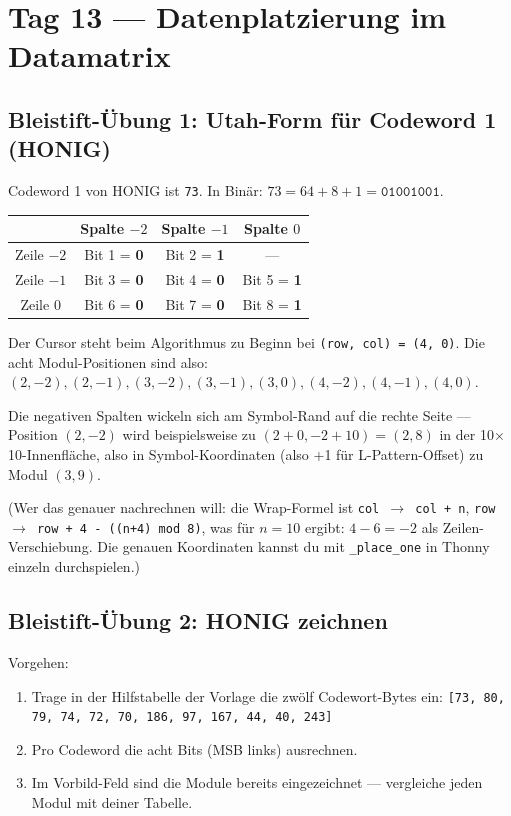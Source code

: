 \section*{Tag 13 — Datenplatzierung im Datamatrix}

\subsection*{Bleistift-Übung 1: Utah-Form für Codeword 1 (HONIG)}

Codeword 1 von HONIG ist \texttt{73}. In Binär: $73 = 64 + 8 + 1 =
\texttt{01001001}$.

\begin{center}
\small
\begin{tabular}{c | c c c}
\toprule
& Spalte $-2$ & Spalte $-1$ & Spalte $0$ \\
\midrule
Zeile $-2$ & Bit 1 = \textbf{0} & Bit 2 = \textbf{1} & --- \\
Zeile $-1$ & Bit 3 = \textbf{0} & Bit 4 = \textbf{0} & Bit 5 = \textbf{1} \\
Zeile $0$  & Bit 6 = \textbf{0} & Bit 7 = \textbf{0} & Bit 8 = \textbf{1} \\
\bottomrule
\end{tabular}
\end{center}

Der Cursor steht beim Algorithmus zu Beginn bei \texttt{(row, col) =
(4, 0)}. Die acht Modul-Positionen sind also:
$(2, -2), (2, -1), (3, -2), (3, -1), (3, 0), (4, -2), (4, -1), (4, 0)$.

Die negativen Spalten wickeln sich am Symbol-Rand auf die rechte
Seite — Position $(2, -2)$ wird beispielsweise zu $(2 + 0, -2 + 10) =
(2, 8)$ in der 10$\times$10-Innenfläche, also in Symbol-Koordinaten
(also +1 für L-Pattern-Offset) zu Modul $(3, 9)$.

(Wer das genauer nachrechnen will: die Wrap-Formel ist
\texttt{col $\to$ col + n}, \texttt{row $\to$ row + 4 - ((n+4) mod 8)},
was für $n=10$ ergibt: $4 - 6 = -2$ als Zeilen-Verschiebung. Die
genauen Koordinaten kannst du mit \texttt{\_place\_one} in Thonny
einzeln durchspielen.)

\subsection*{Bleistift-Übung 2: HONIG zeichnen}

Vorgehen:

\begin{enumerate}
\item Trage in der Hilfstabelle der Vorlage die zwölf Codewort-Bytes
  ein:
  \texttt{[73, 80, 79, 74, 72, 70, 186, 97, 167, 44, 40, 243]}
\item Pro Codeword die acht Bits (MSB links) ausrechnen.
\item Im Vorbild-Feld sind die Module bereits eingezeichnet —
  vergleiche jeden Modul mit deiner Tabelle.
\end{enumerate}


